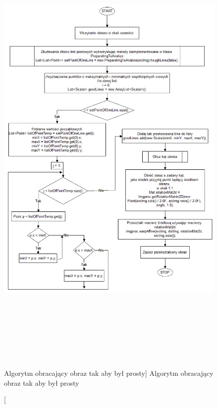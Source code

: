 \documentclass[a4paper,12pt]{article}
\begin{document}
        		 \begin{figure}[!ht]  
                    \begin{center}
        	    	    \includegraphics[height=22.5cm]{image//algorithm//toStraightenUp.png} 
    			    \end{center}
        		    \caption
            			[Algorytm obracający obraz tak aby był prosty]  
            			{Algorytm obracający obraz tak aby był prosty}  
        	    \end{figure}
        		 \newpage
		    
\end{document}
